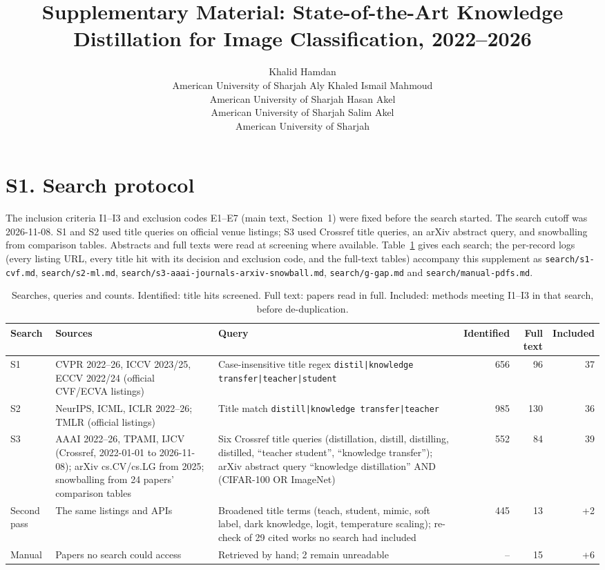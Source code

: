 \documentclass[10pt]{article}
\title{Supplementary Material: State-of-the-Art Knowledge Distillation for Image Classification, 2022--2026}
\author{\name Khalid Hamdan \\ \addr American University of Sharjah
  \AND \name Aly Khaled Ismail Mahmoud \\ \addr American University of Sharjah
  \AND \name Hasan Akel \\ \addr American University of Sharjah
  \AND \name Salim Akel \\ \addr American University of Sharjah}
\begin{document}
\maketitle

\section*{S1. Search protocol}

The inclusion criteria I1--I3 and exclusion codes E1--E7 (main text, Section~1) were fixed before the
search started. The search cutoff was 2026-11-08. S1 and S2 used title queries on official venue listings;
S3 used Crossref title queries, an arXiv abstract query, and snowballing from comparison tables. Abstracts
and full texts were read at screening where available. Table~\ref{tab:s-search} gives each search; the
per-record logs (every listing URL, every title hit with its decision and exclusion code, and the
full-text tables) accompany this supplement as \texttt{search/s1-cvf.md}, \texttt{search/s2-ml.md},
\texttt{search/s3-aaai-journals-arxiv-snowball.md}, \texttt{search/g-gap.md} and
\texttt{search/manual-pdfs.md}.

\begin{table}[h]
\centering\footnotesize\setlength{\tabcolsep}{3pt}
\caption{Searches, queries and counts. Identified: title hits screened. Full text: papers read in full.
Included: methods meeting I1--I3 in that search, before de-duplication.}\label{tab:s-search}
\begin{tabular}{@{}l>{\raggedright\arraybackslash}p{3.6cm}>{\raggedright\arraybackslash}p{5.4cm}rrr@{}}
\toprule
Search & Sources & Query & Identified & Full text & Included \\
\midrule
S1 & CVPR 2022--26, ICCV 2023/25, ECCV 2022/24 (official CVF/ECVA listings) &
  Case-insensitive title regex \texttt{distil|knowledge transfer|teacher|student} & 656 & 96 & 37 \\
S2 & NeurIPS, ICML, ICLR 2022--26; TMLR (official listings) &
  Title match \texttt{distill|knowledge transfer|teacher} & 985 & 130 & 36 \\
S3 & AAAI 2022--26, TPAMI, IJCV (Crossref, 2022-01-01 to 2026-11-08); arXiv cs.CV/cs.LG from 2025;
  snowballing from 24 papers' comparison tables &
  Six Crossref title queries (distillation, distill, distilling, distilled, ``teacher student'',
  ``knowledge transfer''); arXiv abstract query ``knowledge distillation'' AND (CIFAR-100 OR ImageNet) &
  552 & 84 & 39 \\
\midrule
Second pass & The same listings and APIs &
  Broadened title terms (teach, student, mimic, soft label, dark knowledge, logit, temperature
  scaling); re-check of 29 cited works no search had included & 445 & 13 & +2 \\
Manual & Papers no search could access & Retrieved by hand; 2 remain unreadable & -- & 15 & +6 \\
\bottomrule
\end{tabular}
\end{table}
\end{document}
